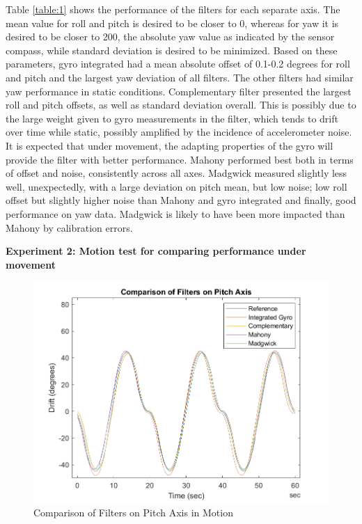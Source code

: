 Table \ref{table:1} shows the performance of the filters for each separate axis. The mean value for roll and pitch is desired to be closer to 0, whereas for yaw it is desired to be closer to 200, the absolute yaw value as indicated by the sensor compass, while standard deviation is desired to be minimized. Based on these parameters, gyro integrated had a mean absolute offset of 0.1-0.2 degrees for roll and pitch and the largest yaw deviation of all filters. The other filters had similar yaw performance in static conditions. Complementary filter presented the largest roll and pitch offsets, as well as standard deviation overall. This is possibly due to the large weight given to gyro measurements in the filter, which tends to drift over time while static, possibly amplified by the incidence of accelerometer noise. It is expected that under movement, the adapting properties of the gyro will provide the filter with better performance. Mahony performed best both in terms of offset and noise, consistently across all axes. Madgwick measured slightly less well, unexpectedly, with a large deviation on pitch mean, but low noise; low roll offset but slightly higher noise than Mahony and gyro integrated and finally, good performance on yaw data. Madgwick is likely to have been more impacted  than Mahony by calibration errors. 

\vspace{30mm}

\textbf{Experiment 2: Motion test for comparing performance under movement}

\begin{figure}[H]
    \centering
    \includegraphics[scale=1]{graphics/Navigation/CombinedMotionPitch.png}
    \caption{Comparison of Filters on Pitch Axis in Motion}
     \label{fig:Comparison of Filters on Pitch Axis in Motion}
\end{figure} 

